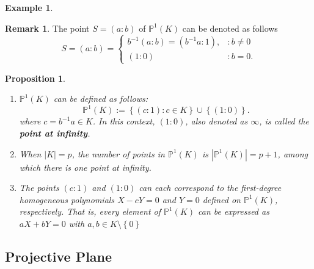 \documentclass[12pt,openany]{book}
\newtheorem{proposition}[theorem]{Proposition}
\theoremstyle{definition}
\newtheorem{remark}{Remark}[chapter]
\newtheorem{example}{Example}[chapter]
\newcommand{\set}[1]{\left\{#1\right\}}
\newcommand{\inv}[1]{#1^{-1}}
\newcommand{\abs}[1]{\left\lvert #1 \right\rvert}
\begin{document}
\begin{example}
\begin{center}
		\end{center}
		\fi
	\end{example}
	\vspace{8pt}
	\begin{remark}
		The point $S=(a:b)$ of $\mathbb{P}^1(K)$ can be denoted as follows \[
		S=(a:b)=\begin{cases}
		\inv{b}(a:b)=(\inv{b}a:1), &:b\neq 0\\
		(1:0) &: b=0.
		\end{cases}
		\]
	\end{remark}
	\vspace{8pt}
	\begin{tcolorbox}[colback=white,colframe=procolor,arc=5pt,title={\color{white}\bf }]
		\begin{proposition}
			\ \begin{enumerate}[(1)]
				\item $\mathbb{P}^1(K)$ can be defined as follows: \[
				\mathbb{P}^1(K):=\set{(c:1):c\in K}\cup\set{(1:0)}.
				\] where $c=b^{-1}a\in K$.
				In this context, $(1:0)$, also denoted as $\infty$, is called the \textbf{point at infinity}.
				\item When $\abs{K}=p$, the number of points in $\mathbb{P}^1(K)$ is $\abs{\mathbb{P}^1(K)}=p+1$, among which there is one point at infinity.
				\item The points $(c:1)$ and $(1:0)$ can each correspond to the first-degree homogeneous polynomials $X-cY=0$ and $Y=0$ defined on $\mathbb{P}^1(K)$, respectively. That is, every element of $\mathbb{P}^1(K)$ can be expressed as $aX+bY=0$ with $a,b\in K\setminus\set{0}$
			\end{enumerate}
		\end{proposition}
	\end{tcolorbox}
	
	\subsection{Projective Plane}
	
\end{document}
